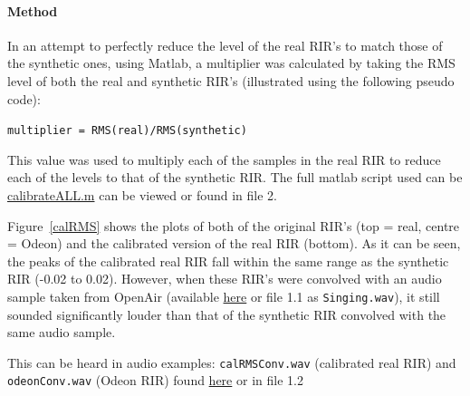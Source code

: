\documentclass[../../main.tex]{subfiles}
\begin{document}
			\paragraph{Method}

			In an attempt to perfectly reduce the level of the real \ac{RIR}'s to match those of the synthetic ones, using Matlab, a multiplier was calculated by taking the RMS level of both the real and synthetic \ac{RIR}'s (illustrated using the following pseudo code):

			\vspace{3mm}
			\begin{center}
				\texttt{multiplier = RMS(real)/RMS(synthetic)}\\
			\end{center}
			\vspace{3mm}

			This value was used to multiply each of the samples in the real \ac{RIR} to reduce each of the levels to that of the synthetic \ac{RIR}. The full matlab script used can be \href{http://lt669.github.io/code/matlab/html/calibrateAll.html}{calibrateALL.m} can be viewed or found in file 2.

			Figure~\ref{calRMS} shows the plots of both of the original \ac{RIR}'s (top = real, centre = Odeon) and the calibrated version of the real \ac{RIR} (bottom). As it can be seen, the peaks of the calibrated real \ac{RIR} fall within the same range as the synthetic \ac{RIR} (-0.02 to 0.02). However, when these \ac{RIR}'s were convolved with an audio sample taken from OpenAir \cite{singingSample} (available \href{http://lt669.github.io/pages/audioSamples.html}{here} or file 1.1 as \texttt{Singing.wav}), it still sounded significantly louder than that of the synthetic RIR convolved with the same audio sample.

			This can be heard in audio examples: \texttt{calRMSConv.wav} (calibrated real \ac{RIR}) and \texttt{odeonConv.wav} (Odeon \ac{RIR}) found \href{http://lt669.github.io/pages/audioSamples.html}{here} or in file 1.2
\end{document}
